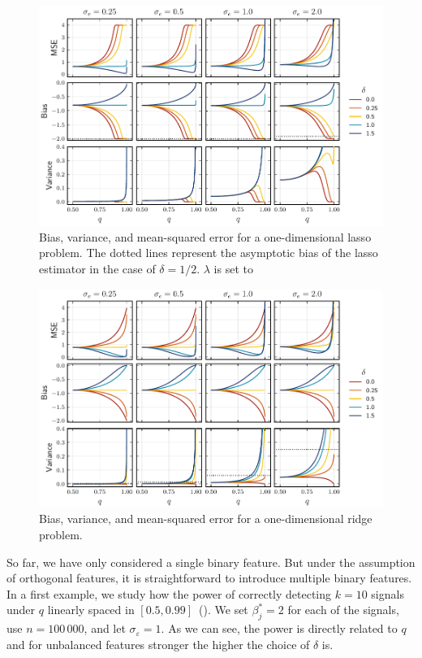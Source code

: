 \begin{figure}[htpb]
  \centering
  \includegraphics[]{plots/binary_onedim_bias_var_lasso.pdf}
  \caption{%
    Bias, variance, and mean-squared error for a one-dimensional lasso problem.
    The dotted lines represent the asymptotic bias of the lasso estimator in the case of \(\delta = 1/2\). \(\lambda\) is set to
  }
  \label{fig:bias-var-onedim-lasso}
\end{figure}

\begin{figure}[htpb]
  \centering
  \includegraphics[]{plots/binary_onedim_bias_var_ridge.pdf}
  \caption{%
    Bias, variance, and mean-squared error for a one-dimensional ridge problem.
  }
  \label{fig:bias-var-onedim-ridge}
\end{figure}

So far, we have only considered a single binary feature. But under the assumption of orthogonal features, it is straightforward to introduce multiple binary features. In a first example, we study how the power of correctly detecting \(k=10\) signals under \(q\) linearly spaced in \([0.5, 0.99]\)~(). We set \(\beta^*_j = 2\) for each of the signals, use \(n = 100\,000\), and let \(\sigma_\varepsilon = 1\). As we can see, the power is directly related to \(q\) and for unbalanced features stronger the higher the choice of \(\delta\) is.

